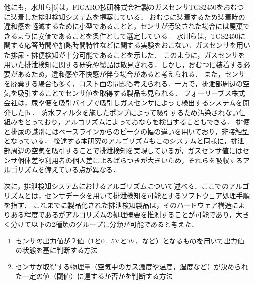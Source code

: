 他にも，水川ら[6]は，FIGARO技研株式会社製のガスセンサTGS2450をおむつに装着した排泄検知システムを提案している．
おむつに装着するため装着時の違和感を軽減するために小型であることと，センサが汚染された場合には廃棄できるように安価であることを条件として選定している．
水川らは，TGS2450に関する応答時間や加熱時間特性などに関する実験をおこない，ガスセンサを用いた排尿・排便検知が十分可能であることを示した．
このように，ガスセンサを用いた排泄検知に関する研究や製品は散見される．しかし，おむつに装着する必要があるため，違和感や不快感が伴う場合があると考えられる．
また，センサを廃棄する場合も多く，コスト面の問題も考えられる．一方で，排泄部周辺の空気を吸引することでセンサ値を取得する製品も見られる．
フォーリーブス株式会社は，尿や便を吸引パイプで吸引しガスセンサによって検出するシステムを開発した[b]．
防水フィルタを施したポンプによって吸引するため汚染されない仕組みをとっており，アルゴリズムによっておならを検出することもできる．
排便と排尿の識別にはベースラインからのピークの幅の違いを用いており，非接触型となっている．
後述する本研究のアルゴリズムもこのシステムと同様に，排泄部周辺の空気を吸引することで排泄検知を実現しているが，ガスセンサ値にはセンサ個体差や利用者の個人差によるばらつきが大きいため，それらを吸収するアルゴリズムを備えている点が異なる．\par

次に，排泄検知システムにおけるアルゴリズムについて述べる．ここでのアルゴリズムとは，センサデータを用いて排泄検知を可能とするソフトウェア処理手順を指す．
これまでに製品化された排泄検知製品は，そのハードウェア構造によりある程度であるがアルゴリズムの処理概要を推測することが可能であり，大きく分けて以下の2種類のグループに分類が可能であると考えた．
\begin{enumerate}
\item センサの出力値が２値（1と0，5Vと0V，など）となるものを用いて出力値の状態を基に判断する方法
\item センサが取得する物理量（空気中のガス濃度や温度，湿度など）が決められた一定の値（閾値）に達するか否かを判断する方法
\end{enumerate}
\par


